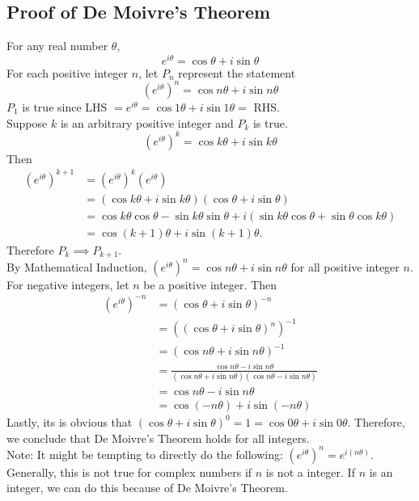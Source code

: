 \documentclass[a4paper,12pt,oneside]{book}
\begin{document}
\subsection{Proof of De Moivre's Theorem}
For any real number $\theta$, $$e^{i\theta}=\cos\theta+i\sin\theta$$
For each positive integer $n$, let $P_n$ represent the statement $$(e^{i\theta})^n=\cos n\theta+i\sin n\theta$$
$P_1$ is true since LHS $= e^{i\theta} = \cos 1\theta+i\sin1\theta = $ RHS.\\
Suppose $k$ is an arbitrary positive integer and $P_k$ is true. $$(e^{i\theta})^k=\cos k\theta+i\sin k\theta$$
Then 
\begin{align*}
(e^{i\theta})^{k+1}
&=(e^{i\theta})^k(e^{i\theta})\\
&=(\cos k\theta+i\sin k\theta)(\cos \theta+i\sin \theta) \\
&=\cos k\theta \cos \theta-\sin k\theta\sin \theta+i(\sin k\theta\cos \theta+\sin \theta \cos k\theta)  \\
&=\cos(k+1)\theta+i\sin(k+1)\theta.
\end{align*}
Therefore $P_k \implies P_{k+1}$.\\
By Mathematical Induction, $(e^{i\theta})^{n}=\cos n\theta+i\sin n\theta$ for all positive integer $n$.\\
For negative integers, let $n$ be a positive integer. Then 
\begin{align*}
(e^{i\theta})^{-n} 
&= (\cos \theta + i\sin\theta)^{-n} \\
&= ((\cos\theta + i\sin\theta)^n)^{-1}\\
&= (\cos n\theta + i\sin n \theta)^{-1}\\
&= \frac{\cos n\theta-i\sin n\theta}{(\cos n\theta + i\sin n \theta)(\cos n\theta - i\sin n \theta)}\\
&= \cos n\theta - i\sin n\theta\\
&= \cos (-n\theta) + i\sin (-n\theta)
\end{align*}
Lastly, its is obvious that $(\cos\theta + i\sin\theta)^0 = 1 =\cos0\theta + i\sin 0 \theta$. Therefore, we conclude that De Moivre's Theorem holds for all integers.\\
Note: It might be tempting to directly do the following:
$(e^{i\theta})^n = e^{i(n\theta)}$. Generally, this is not true for complex numbers if $n$ is not a integer. If $n$ is an integer, we can do this because of De Moivre's Theorem.\\          
\end{document}
